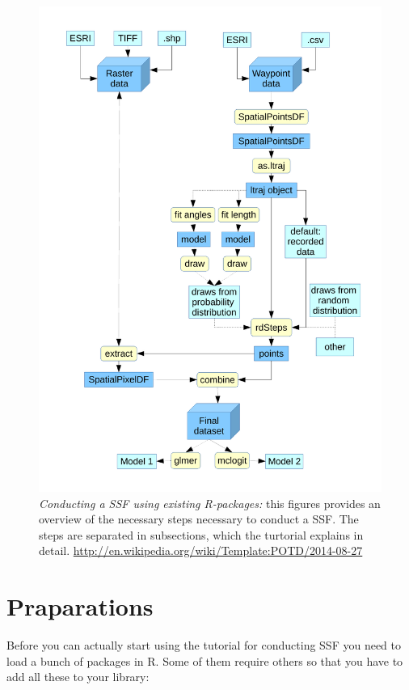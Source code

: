 \documentclass[11pt, a4paper]{article}\usepackage[]{graphicx}\usepackage[]{color}
\begin{document}
\begin{figure} %
\captionsetup{width=1\textwidth}
\centering
\includegraphics[width=1\textwidth]{Flowchart.pdf} %
\caption{\emph{Conducting a SSF using existing R-packages:} this figures provides an overview of the necessary steps necessary to conduct a SSF. The steps are separated in subsections, which the turtorial explains in detail.   \small{\url{http://en.wikipedia.org/wiki/Template:POTD/2014-08-27}}}
\label{fig:Flowchart}
\end{figure}

\section{Praparations}
Before you can actually start using the tutorial for conducting SSF you need to load a bunch of packages in R. Some of them require others so that you have to add all these to your library:
\end{document}
